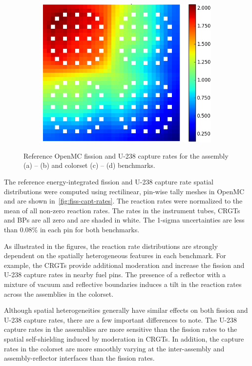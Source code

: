 \begin{figure}[h!]
\begin{subfigure}{0.45\textwidth}
  \caption{}
  \label{fig:fiss-reflector}
\end{subfigure}%
\begin{subfigure}{0.45\textwidth}
  \centering
  \includegraphics[width=0.8\linewidth]{figures/reflector/capture-rates}
  \caption{}
  \label{fig:capt-reflector}
\end{subfigure}
\caption{Reference OpenMC fission and U-238 capture rates for the assembly (a) -- (b) and colorset (c) -- (d) benchmarks.}
\label{fig:fiss-capt-rates}
\end{figure}

The reference energy-integrated fission and U-238 capture rate spatial distributions were computed using rectilinear, pin-wise tally meshes in OpenMC and are shown in~\autoref{fig:fiss-capt-rates}. The reaction rates were normalized to the mean of all non-zero reaction rates. The rates in the instrument tubes, CRGTs and BPs are all zero and are shaded in white. The 1-sigma uncertainties are less than 0.08\% in each pin for both benchmarks.


As illustrated in the figures, the reaction rate distributions are strongly dependent on the spatially heterogeneous features in each benchmark. For example, the CRGTs provide additional moderation and increase the fission and U-238 capture rates in nearby fuel pins. The presence of a reflector with a mixture of vacuum and reflective boundaries induces a tilt in the reaction rates across the assemblies in the colorset.

Although spatial heterogeneities generally have similar effects on both fission and U-238 capture rates, there are a few important differences to note. The U-238 capture rates in the assemblies are more sensitive than the fission rates to the spatial self-shielding induced by moderation in CRGTs. In addition, the capture rates in the colorset are more smoothly varying at the inter-assembly and assembly-reflector interfaces than the fission rates.
